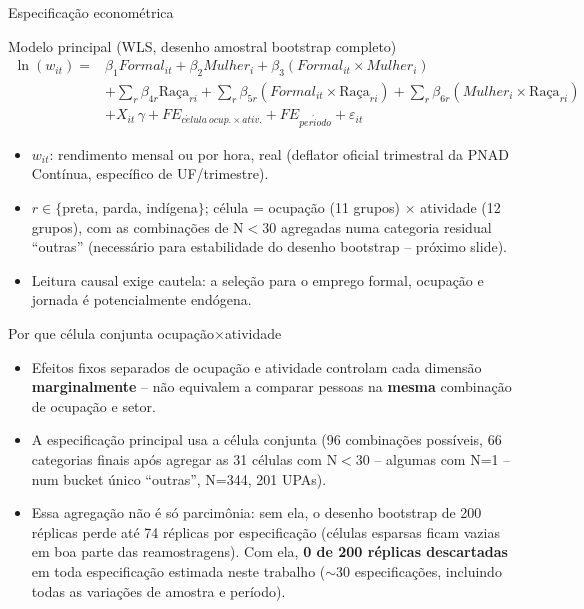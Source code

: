 \documentclass[aspectratio=169]{beamer}
\newcommand{\highlight}[1]{\textcolor{accentblue}{\textbf{#1}}}
\begin{document}
\begin{frame}{Especifica\c{c}\~ao econom\'etrica}
  \small
  \begin{block}{Modelo principal (WLS, desenho amostral bootstrap completo)}
    \setlength{\abovedisplayskip}{2pt}
    \setlength{\belowdisplayskip}{2pt}
    \begin{align*}
      \ln(w_{it}) = {} & \beta_1 Formal_{it} + \beta_2 Mulher_i + \beta_3 (Formal_{it}\times Mulher_i) \\
                        & + \textstyle\sum_r \beta_{4r} \text{Ra\c{c}a}_{ri} + \sum_r \beta_{5r} (Formal_{it}\times \text{Ra\c{c}a}_{ri}) + \sum_r \beta_{6r} (Mulher_i\times \text{Ra\c{c}a}_{ri}) \\
                        & + X_{it}\,\gamma + FE_{c\acute{e}lula\ ocup.\times ativ.} + FE_{per\acute{i}odo} + \varepsilon_{it}
    \end{align*}
  \end{block}
  \footnotesize
  \begin{itemize}
    \item $w_{it}$: rendimento mensal ou por hora, real (deflator oficial trimestral da PNAD Cont\'inua, espec\'ifico de UF/trimestre).
    \item $r \in \{$preta, parda, ind\'igena$\}$; c\'elula = ocupa\c{c}\~ao (11 grupos) $\times$ atividade (12 grupos), com as combina\c{c}\~oes de N$<$30 agregadas numa categoria residual ``outras'' (necess\'ario para estabilidade do desenho bootstrap -- pr\'oximo slide).
    \item Leitura causal exige cautela: a sele\c{c}\~ao para o emprego formal, ocupa\c{c}\~ao e jornada \'e potencialmente end\'ogena.
  \end{itemize}
\end{frame}

\begin{frame}{Por que c\'elula conjunta ocupa\c{c}\~ao$\times$atividade}
  \begin{itemize}
    \item Efeitos fixos separados de ocupa\c{c}\~ao e atividade controlam cada dimens\~ao \highlight{marginalmente} -- n\~ao equivalem a comparar pessoas na \highlight{mesma} combina\c{c}\~ao de ocupa\c{c}\~ao e setor.
    \item A especifica\c{c}\~ao principal usa a c\'elula conjunta (96 combina\c{c}\~oes poss\'iveis, 66 categorias finais ap\'os agregar as 31 c\'elulas com N$<$30 -- algumas com N=1 -- num bucket \'unico ``outras'', N=344, 201 UPAs).
    \item Essa agrega\c{c}\~ao n\~ao \'e s\'o parcim\^onia: sem ela, o desenho bootstrap de 200 r\'eplicas perde at\'e 74 r\'eplicas por especifica\c{c}\~ao (c\'elulas esparsas ficam vazias em boa parte das reamostragens). Com ela, \highlight{0 de 200 r\'eplicas descartadas} em toda especifica\c{c}\~ao estimada neste trabalho ($\sim$30 especifica\c{c}\~oes, incluindo todas as varia\c{c}\~oes de amostra e per\'iodo).
  \end{itemize}
\end{frame}
\end{document}
